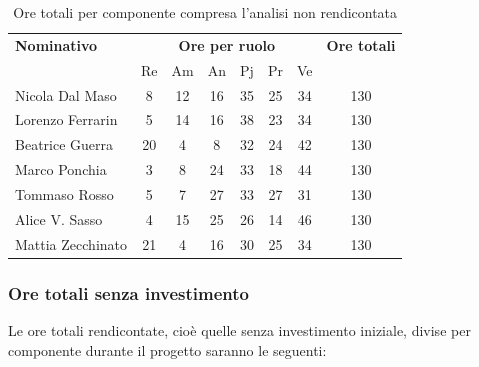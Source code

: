 \begin{table}[H]
	\centering
	\begin{tabular}{|l|c|c|c|c|c|c|c|}
		\hline
		\textbf{Nominativo} & 
		\multicolumn{6}{c|}{\textbf{Ore per ruolo}} & 
		\textbf{Ore totali} \\
		& Re & Am & An & Pj & Pr & Ve & \\
		\hline
		Nicola Dal Maso &8 &12 &16 &35 &25 &34 & 130 \\
		Lorenzo Ferrarin &5 &14 &16 &38 &23 &34 & 130 \\
		Beatrice Guerra &20 &4 &8 &32 &24 &42 & 130 \\
		Marco Ponchia &3 &8 &24 &33 &18 &44 & 130 \\
		Tommaso Rosso &5 &7 &27 &33 &27 &31 & 130 \\
		Alice V. Sasso &4 &15 &25 &26 &14 &46 & 130 \\
		Mattia Zecchinato &21 &4 &16 &30 &25 &34 & 130 \\
		\hline
	\end{tabular}
	\caption{Ore totali per componente compresa l'analisi non rendicontata}
\end{table}

\subsubsection{Ore totali senza investimento}
Le ore totali rendicontate, cioè quelle senza investimento iniziale, divise per componente durante il progetto saranno le seguenti:

